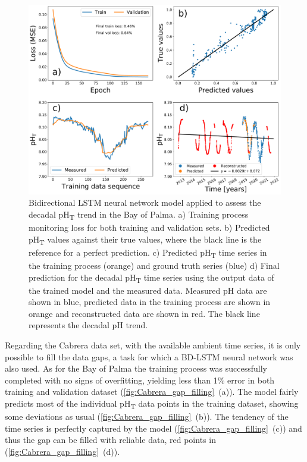\begin{figure}[H]
    \centering
    \includegraphics[width=1\textwidth]{Figures/Best_bidirectional_LSTM.pdf}
    \caption[Deep learning model applied to assess the
        decadal pH\textsubscript{T} trend in the Bay of Palma]{Bidirectional
        LSTM neural network model applied to assess the decadal
        pH\textsubscript{T} trend in the Bay of Palma. a) Training process
        monitoring loss for both training and validation sets. b) Predicted
        pH\textsubscript{T} values against their true values, where the black
        line is the reference for a perfect prediction. c) Predicted
        pH\textsubscript{T} time series in the training process (orange) and
        ground truth series (blue) d) Final prediction for the decadal
        pH\textsubscript{T} time series using the output data of the trained
        model and the measured data. Measured pH data are shown in blue,
        predicted data in the training process are shown in orange and
        reconstructed data are shown in red. The black line represents the
        decadal pH trend.}
    \label{fig:best_LSTM}
\end{figure}

Regarding the Cabrera data set, with the available ambient time series, it
is only possible to fill the data gaps, a task for which a BD-LSTM neural
network was also used. As for the Bay of Palma the training process was
successfully completed with no signs of overfitting, yielding less than 1\%
error in both training and validation dataset
(\cref{fig:Cabrera_gap_filling}~\textcolor{ref_color}{(a)}). The model fairly
predicts most of the
individual pH\textsubscript{T} data points in the training dataset, showing
some deviations as usual
(\cref{fig:Cabrera_gap_filling}~\textcolor{ref_color}{(b)}). The tendency of
the time series is perfectly captured by the model
(\cref{fig:Cabrera_gap_filling}~\textcolor{ref_color}{(c)}) and thus the gap
can be filled with
reliable data, red points in
(\cref{fig:Cabrera_gap_filling}~\textcolor{ref_color}{(d)}).

